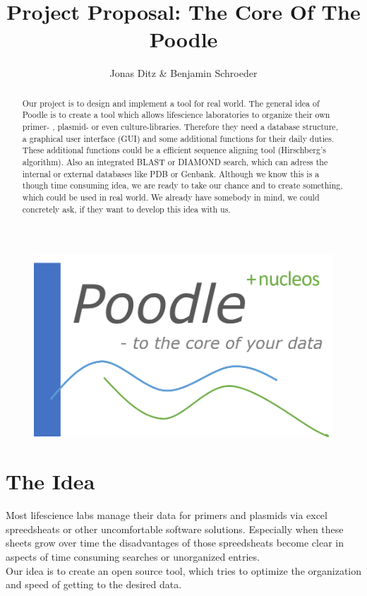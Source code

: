 \documentclass[]{article}
\title{Project Proposal: The Core Of The Poodle}
\author{Jonas Ditz  \& Benjamin Schroeder}
\begin{document}
\maketitle
\begin{figure}[h]
	\centering
	\includegraphics[scale=0.35]{img/logo_poodle.png}
\end{figure}

\begin{abstract}
Our project is to design and implement a tool for real world. The general idea of Poodle is to create a tool which allows lifescience laboratories to organize their own primer- , plasmid- or even culture-libraries. Therefore they need a database structure, a graphical user interface (GUI) and some additional functions for their daily duties. These additional functions could be a efficient sequence aligning tool (Hirschberg's algorithm). Also an integrated BLAST or DIAMOND search, which can adress the internal or external databases like PDB or Genbank. Although we know this is a though time consuming idea, we are ready to take our chance and to create something, which could be used in real world. We already have somebody in mind, we could concretely ask, if they want to develop this idea with us. 
\end{abstract}

\section{ The Idea}
Most lifescience labs manage their data for primers and plasmids via excel spreedsheats or other uncomfortable software solutions. Especially when these sheets grow over time the disadvantages of those spreedsheats become clear in aspects of time consuming searches or unorganized entries. 
\\
Our idea is to create an open source tool, which tries to optimize the organization and speed of getting to the desired data.
\end{document}
